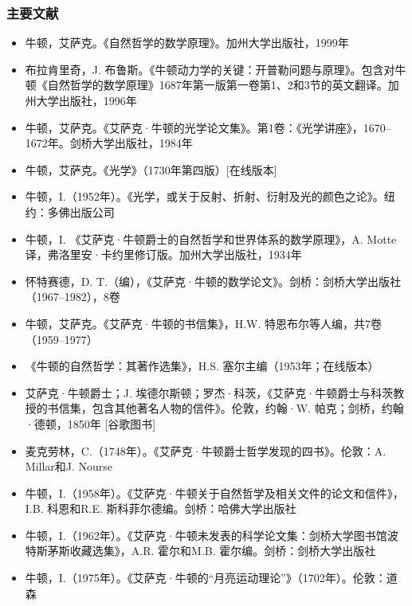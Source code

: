 \subsubsection{主要文献}
\begin{itemize}
\item 牛顿，艾萨克。《自然哲学的数学原理》。加州大学出版社，1999年
  \item 布拉肯里奇，J. 布鲁斯。《牛顿动力学的关键：开普勒问题与原理》。包含对牛顿《自然哲学的数学原理》1687年第一版第一卷第1、2和3节的英文翻译。加州大学出版社，1996年
\item 牛顿，艾萨克。《艾萨克·牛顿的光学论文集》。第1卷：《光学讲座》，1670–1672年。剑桥大学出版社，1984年
\item 牛顿，艾萨克。《光学》（1730年第四版）[在线版本]
  \item 牛顿，I.（1952年）。《光学，或关于反射、折射、衍射及光的颜色之论》。纽约：多佛出版公司
\item 牛顿，I. 《艾萨克·牛顿爵士的自然哲学和世界体系的数学原理》，A. Motte译，弗洛里安·卡约里修订版。加州大学出版社，1934年
\item 怀特赛德，D. T.（编），《艾萨克·牛顿的数学论文》。剑桥：剑桥大学出版社（1967–1982），8卷
\item  牛顿，艾萨克。《艾萨克·牛顿的书信集》，H.W. 特恩布尔等人编，共7卷（1959–1977）
\item 《牛顿的自然哲学：其著作选集》，H.S. 塞尔主编（1953年；在线版本）
\item 艾萨克·牛顿爵士；J. 埃德尔斯顿；罗杰·科茨，《艾萨克·牛顿爵士与科茨教授的书信集，包含其他著名人物的信件》。伦敦，约翰·W. 帕克；剑桥，约翰·德顿，1850年 [谷歌图书]
\item  麦克劳林，C.（1748年）。《艾萨克·牛顿爵士哲学发现的四书》。伦敦：A. Millar和J. Nourse
\item 牛顿，I.（1958年）。《艾萨克·牛顿关于自然哲学及相关文件的论文和信件》，I.B. 科恩和R.E. 斯科菲尔德编。剑桥：哈佛大学出版社
\item 牛顿，I.（1962年）。《艾萨克·牛顿未发表的科学论文集：剑桥大学图书馆波特斯茅斯收藏选集》，A.R. 霍尔和M.B. 霍尔编。剑桥：剑桥大学出版社
\item  牛顿，I.（1975年）。《艾萨克·牛顿的“月亮运动理论”》（1702年）。伦敦：道森
\end{itemize}
